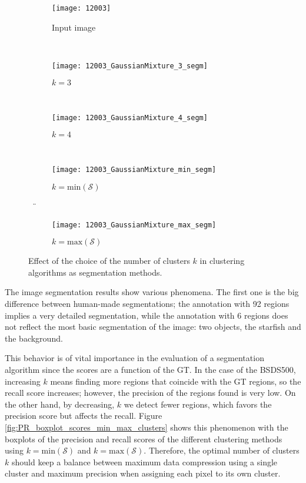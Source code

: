 \begin{figure}[!ht]
    
    \begin{subfigure}[b]{0.23\textwidth}
        \texttt{[image: 12003]}
        \caption{Input image}
    \end{subfigure} \\  \vspace{5pt}
    
    \begin{subfigure}[b]{0.23\textwidth}
    	\centering
    	\texttt{[image: 12003\_GaussianMixture\_3\_segm]}
        \caption{$k=3$ }
    \end{subfigure} ~
    \begin{subfigure}[b]{0.23\textwidth}
    	\centering
        \texttt{[image: 12003\_GaussianMixture\_4\_segm]}
        \caption{$k=4$}
    \end{subfigure} ~
    \begin{subfigure}[b]{0.23\textwidth}
    	\centering
    	\texttt{[image: 12003\_GaussianMixture\_min\_segm]}
        \caption{$k=\mathrm{min}(\mathcal{S})$}
    \end{subfigure} ~¨
    \begin{subfigure}[b]{0.23\textwidth}
    	\centering
    	\texttt{[image: 12003\_GaussianMixture\_max\_segm]}
        \caption{$k=\mathrm{max}(\mathcal{S})$}
    \end{subfigure} 
        	    
    \caption{Effect of the choice of the number of clusters $k$ in clustering algorithms as segmentation methods.}\label{fig:Gmixture_starfish_segms_diff_k}    
\end{figure}

The image segmentation results show various phenomena. The first one is the big difference between human-made segmentations; the annotation with 92 regions implies a very detailed segmentation, while the annotation with 6 regions does not reflect the most basic segmentation of the image: two objects, the starfish and the background.

This behavior is of vital importance in the evaluation of a segmentation algorithm since the scores are a function of the GT. In the case of the BSDS500, increasing $k$ means finding more regions that coincide with the GT regions, so the recall score increases; however, the precision of the regions found is very low. On the other hand, by decreasing, $k$ we detect fewer regions, which favors the precision score but affects the recall. Figure \ref{fig:PR_boxplot_scores_min_max_clusters} shows this phenomenon with the boxplots of the precision and recall scores of the different clustering methods using $k = \mathrm{min}(\mathcal{S})$ and $k = \mathrm{max}(\mathcal{S})$. Therefore, the optimal number of clusters $k$ should keep a balance between maximum data compression using a single cluster and maximum precision when assigning each pixel to its own cluster.


